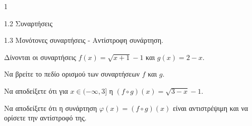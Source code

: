 \begin{ylh}{1}
    \item 1.2 Συναρτήσεις
    \item 1.3 Μονότονες συναρτήσεις - Αντίστροφη συνάρτηση.
\end{ylh}
Δίνονται οι συναρτήσεις $f(x) = \sqrt{x+1}-1$ και $g(x) = 2-x$.
\begin{alist}
\item Να βρείτε το πεδίο ορισμού των συναρτήσεων $f$ και $g$. 
\item Να αποδείξετε ότι για $x \in (-\infty,3]$ η $(f \circ g)(x) = \sqrt{3-x}-1$. 
\item Να αποδείξετε ότι η συνάρτηση $\varphi(x)=(f \circ g)(x)$ είναι αντιστρέψιμη και να ορίσετε την αντίστροφό της. 
\end{alist}